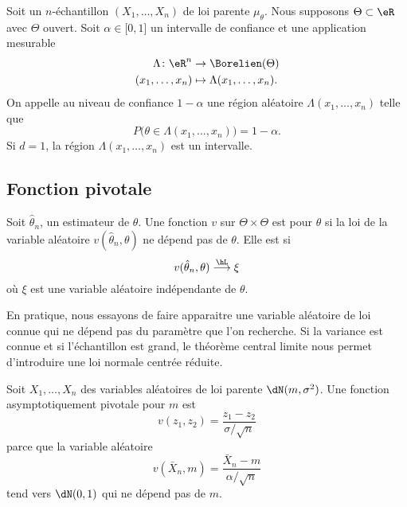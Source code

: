 Soit un \( n\)-échantillon \( (X_1,\ldots,X_n)\) de loi parente \( \mu_{\theta}\). Nous supposons \( \Theta\subset\eR\) avec \( \Theta\) ouvert. Soit \( \alpha\in\mathopen[ 0 , 1 \mathclose]\) un intervalle de confiance et une application mesurable
\begin{equation}
	\begin{aligned}
		\Lambda\colon \eR^n & \to \Borelien(\Theta)            \\
		(x_1,\ldots,x_n)    & \mapsto \Lambda(x_1,\ldots,x_n).
	\end{aligned}
\end{equation}
On appelle  au niveau de confiance \( 1-\alpha\) une région aléatoire \( \Lambda(x_1,\ldots,x_n)\) telle que
\begin{equation}
	P\big( \theta\in\Lambda(x_1,\ldots,x_n) \big)=1-\alpha.
\end{equation}
Si \( d=1\), la région \( \Lambda(x_1,\ldots,x_n)\) est un intervalle.

\subsection{Fonction pivotale}

Soit \( \hat\theta_n\), un estimateur de \( \theta\). Une fonction \( v\) sur \( \Theta\times\Theta\) est  pour \( \theta\) si la loi de la variable aléatoire \( v(\hat\theta_n,\theta)\) ne dépend pas de \( \theta\). Elle est  si
\begin{equation}
	v(\hat\theta_n,\theta)\stackrel{\hL}{\longrightarrow}\xi
\end{equation}
où \( \xi\) est une variable aléatoire indépendante de \( \theta\).

En pratique, nous essayons de faire apparaitre une variable aléatoire de loi connue qui ne dépend pas du paramètre que l'on recherche. Si la variance est connue et si l'échantillon est grand, le théorème central limite nous permet d'introduire une loi normale centrée réduite.

\begin{example}
	Soit \( X_1,\ldots,X_n\) des variables aléatoires de loi parente \( \dN(m,\sigma^2)\). Une fonction asymptotiquement pivotale pour \( m\) est
	\begin{equation}
		v(z_1,z_2)=\frac{ z_1-z_2 }{ \sigma/\sqrt{n} }
	\end{equation}
	parce que la variable aléatoire
	\begin{equation}
		v(\bar X_n,m)=\frac{ \bar X_n-m }{ \alpha/\sqrt{n} }
	\end{equation}
	tend vers \( \dN(0,1)\) qui ne dépend pas de \( m\).
\end{example}

